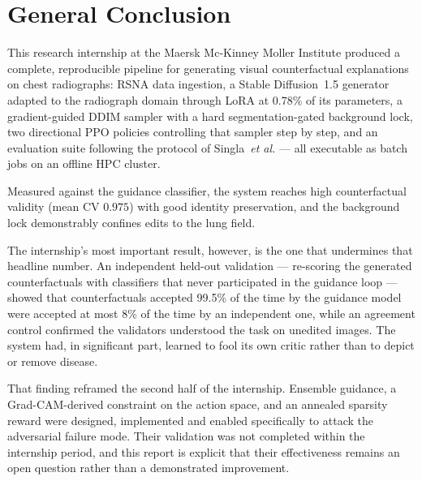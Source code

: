 \chapter*{General Conclusion}

This research internship at the Maersk Mc-Kinney Moller Institute
produced a complete, reproducible pipeline for generating visual
counterfactual explanations on chest radiographs: RSNA data ingestion, a
Stable Diffusion~1.5 generator adapted to the radiograph domain through
LoRA at 0.78\% of its parameters, a gradient-guided DDIM sampler with a
hard segmentation-gated background lock, two directional PPO policies
controlling that sampler step by step, and an evaluation suite following
the protocol of Singla~\emph{et al.} --- all executable as batch jobs on
an offline HPC cluster.

Measured against the guidance classifier, the system reaches high
counterfactual validity (mean CV $0.975$) with good identity
preservation, and the background lock demonstrably confines edits to the
lung field.

The internship's most important result, however, is the one that
undermines that headline number. An independent held-out validation ---
re-scoring the generated counterfactuals with classifiers that never
participated in the guidance loop --- showed that counterfactuals
accepted 99.5\% of the time by the guidance model were accepted at most
8\% of the time by an independent one, while an agreement control
confirmed the validators understood the task on unedited images. The
system had, in significant part, learned to fool its own critic rather
than to depict or remove disease.

That finding reframed the second half of the internship. Ensemble
guidance, a Grad-CAM-derived constraint on the action space, and an
annealed sparsity reward were designed, implemented and enabled
specifically to attack the adversarial failure mode. Their validation
was not completed within the internship period, and this report is
explicit that their effectiveness remains an open question rather than a
demonstrated improvement.

